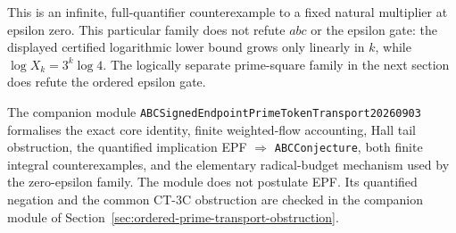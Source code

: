 This is an infinite, full-quantifier counterexample to a fixed natural
multiplier at epsilon zero.  This particular family does not refute $abc$ or
the epsilon gate: the displayed certified logarithmic lower bound grows only
linearly in $k$, while $\log X_k=3^k\log4$.  The logically separate
prime-square family in the next section does refute the ordered epsilon gate.

The companion module
\texttt{ABCSignedEndpointPrimeToken\allowbreak Transport20260903} formalises the exact
core identity, finite weighted-flow accounting, Hall tail obstruction, the
quantified implication EPF $\Rightarrow$ \texttt{ABCConjecture}, both finite
integral counterexamples, and the elementary radical-budget mechanism used by
the zero-epsilon family.  The module does not postulate EPF.  Its quantified
negation and the common CT-3C obstruction are checked in the companion module
of Section~\ref{sec:ordered-prime-transport-obstruction}.
